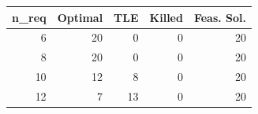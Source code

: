 
\begin{tabular}{rrrrr}
\toprule
n\_req & Optimal & TLE & Killed & Feas. Sol.\\
\midrule
6 & 20 & 0 & 0 & 20\\
8 & 20 & 0 & 0 & 20\\
10 & 12 & 8 & 0 & 20\\
12 & 7 & 13 & 0 & 20\\
\bottomrule
\end{tabular}
